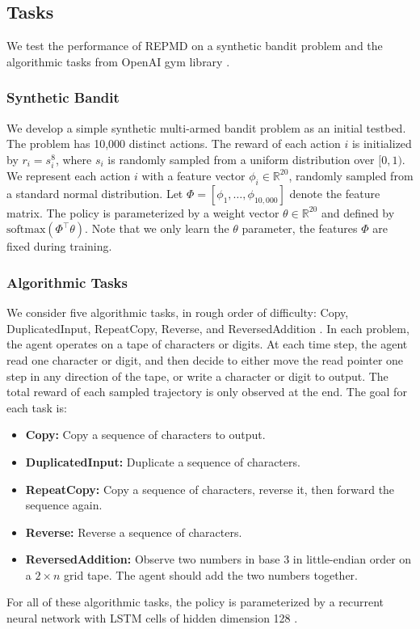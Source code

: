 \documentclass{article}
\begin{document}
\subsection{Tasks}
We test the performance of REPMD on a synthetic bandit problem and the algorithmic tasks from OpenAI gym library \cite{1606.01540}.  
\subsubsection{Synthetic Bandit}

We develop a simple synthetic multi-armed bandit problem as an initial testbed. The problem has 10,000 distinct actions. The reward of each action $i$ is initialized by $r_i = s_i^{8}$, where $s_i$ is randomly sampled from a uniform distribution over $[0,1)$. We represent each action $i$ with a feature vector $\phi_i\in \mathbb{R}^{20}$, randomly sampled from a standard normal distribution. Let $\Phi=[\phi_1,\dots,\phi_{10,000}]$ denote the feature matrix. The policy is parameterized by a weight vector $\theta\in  \mathbb{R}^{20}$ and  defined by $\text{softmax}(\Phi^{\top}\theta)$. Note that we only learn the $\theta$ parameter, the features $\Phi$ are fixed during training. 

\subsubsection{Algorithmic Tasks}

We consider five algorithmic tasks, in rough order of difficulty: Copy, DuplicatedInput, RepeatCopy, Reverse, and ReversedAddition \cite{1606.01540}. In each problem, the agent operates on a tape of characters or digits. At each time step, the agent read one character or digit, and then decide to either move the read pointer one step in any direction of the tape, or write a character or digit to output. The total reward of each sampled trajectory is only observed at the end. The goal for each task is:
\begin{itemize}
\item \textbf{Copy:} Copy a sequence of characters to output. 
\item \textbf{DuplicatedInput:} Duplicate a sequence of characters.
\item \textbf{RepeatCopy:} Copy a sequence of characters, reverse it, then forward the sequence again. 
\item \textbf{Reverse:} Reverse a sequence of characters.
\item \textbf{ReversedAddition:} Observe two numbers in base 3 in little-endian order on a $2\times n$ grid tape. The agent should add the two numbers together. 
\end{itemize}
For all of these algorithmic tasks, the policy is parameterized by a recurrent neural network with LSTM cells of hidden dimension 128 \cite{hochreiter1997long}. 
\end{document}
